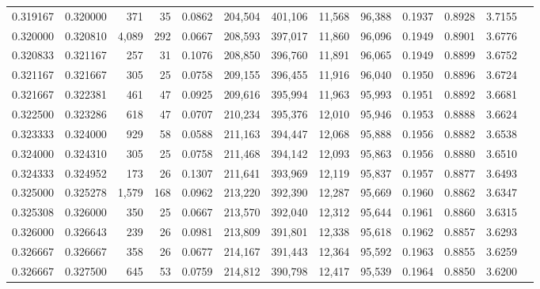 \begin{tabular}{rrrrrrrrrrrrr}
0.319167 & 0.320000 &   371 &  35 &                                     0.0862 & 204,504 & 401,106 &  11,568 &  96,388 & 0.1937 & 0.8928 & 3.7155 \\
0.320000 & 0.320810 & 4,089 & 292 &                                     0.0667 & 208,593 & 397,017 &  11,860 &  96,096 & 0.1949 & 0.8901 & 3.6776 \\
0.320833 & 0.321167 &   257 &  31 &                                     0.1076 & 208,850 & 396,760 &  11,891 &  96,065 & 0.1949 & 0.8899 & 3.6752 \\
0.321167 & 0.321667 &   305 &  25 &                                     0.0758 & 209,155 & 396,455 &  11,916 &  96,040 & 0.1950 & 0.8896 & 3.6724 \\
0.321667 & 0.322381 &   461 &  47 &                                     0.0925 & 209,616 & 395,994 &  11,963 &  95,993 & 0.1951 & 0.8892 & 3.6681 \\
0.322500 & 0.323286 &   618 &  47 &                                     0.0707 & 210,234 & 395,376 &  12,010 &  95,946 & 0.1953 & 0.8888 & 3.6624 \\
0.323333 & 0.324000 &   929 &  58 &                                     0.0588 & 211,163 & 394,447 &  12,068 &  95,888 & 0.1956 & 0.8882 & 3.6538 \\
0.324000 & 0.324310 &   305 &  25 &                                     0.0758 & 211,468 & 394,142 &  12,093 &  95,863 & 0.1956 & 0.8880 & 3.6510 \\
0.324333 & 0.324952 &   173 &  26 &                                     0.1307 & 211,641 & 393,969 &  12,119 &  95,837 & 0.1957 & 0.8877 & 3.6493 \\
0.325000 & 0.325278 & 1,579 & 168 &                                     0.0962 & 213,220 & 392,390 &  12,287 &  95,669 & 0.1960 & 0.8862 & 3.6347 \\
0.325308 & 0.326000 &   350 &  25 &                                     0.0667 & 213,570 & 392,040 &  12,312 &  95,644 & 0.1961 & 0.8860 & 3.6315 \\
0.326000 & 0.326643 &   239 &  26 &                                     0.0981 & 213,809 & 391,801 &  12,338 &  95,618 & 0.1962 & 0.8857 & 3.6293 \\
0.326667 & 0.326667 &   358 &  26 &                                     0.0677 & 214,167 & 391,443 &  12,364 &  95,592 & 0.1963 & 0.8855 & 3.6259 \\
0.326667 & 0.327500 &   645 &  53 &                                     0.0759 & 214,812 & 390,798 &  12,417 &  95,539 & 0.1964 & 0.8850 & 3.6200 \\

\end{tabular}
